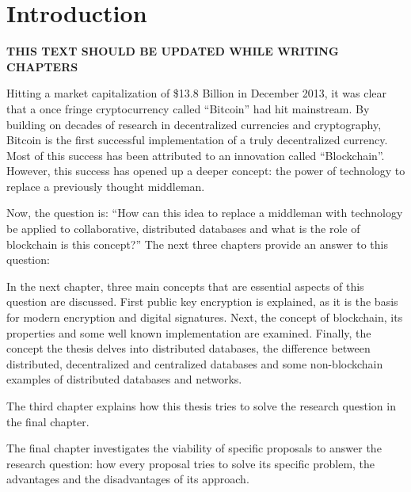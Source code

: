 \chapter{Introduction}

\textbf{THIS TEXT SHOULD BE UPDATED WHILE WRITING CHAPTERS}


Hitting a market capitalization of \$13.8 Billion in December 2013, it was clear that a once fringe cryptocurrency called ``Bitcoin'' had hit mainstream. By building on decades of research in decentralized currencies and cryptography, Bitcoin is the first successful implementation of a truly decentralized currency. Most of this success has been attributed to an innovation called ``Blockchain''. However, this success has opened up a deeper concept: the power of technology to replace a previously thought middleman.


Now, the question is: ``How can this idea to replace a middleman with technology be applied to collaborative, distributed databases and what is the role of blockchain is this concept?'' The next three chapters provide an answer to this question:


In the next chapter, three main concepts that are essential aspects of this question are discussed. First public key encryption is explained, as it is the basis for modern encryption and digital signatures. Next, the concept of blockchain, its properties and some well known implementation are examined. Finally, the concept the thesis delves into distributed databases, the difference between distributed, decentralized and centralized databases and some non-blockchain examples of distributed databases and networks.

The third chapter explains how this thesis tries to solve the research question in the final chapter.

The final chapter investigates the viability of specific proposals to answer the research question: how every proposal tries to solve its specific problem, the advantages and the disadvantages of its approach.